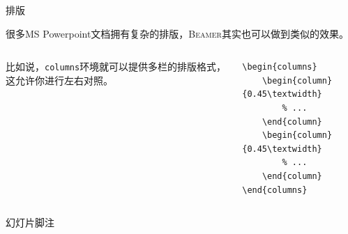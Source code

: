 \documentclass[aspectratio=169]{beamer}
\newcommand{\BibLaTeX}{\textsc{Bib}\LaTeX{}}
\newcommand{\Beamer}{\textsc{Beamer}}
\newcommand{\enableindent}{\setlength{\parskip}{6pt}\setlength{\parindent}{2em}}
\begin{document}
\begin{frame}[fragile]{排版}
	\enableindent

	很多MS Powerpoint文档拥有复杂的排版，\Beamer{}其实也可以做到类似的效果。
	\begin{columns}
		\begin{column}{0.45\textwidth}
			比如说，\texttt{columns}环境就可以提供多栏的排版格式，这允许你进行左右对照。
		\end{column}
		\begin{column}{0.45\textwidth}
\begin{verbatim}
\begin{columns}
    \begin{column}{0.45\textwidth}
        % ...
    \end{column}
    \begin{column}{0.45\textwidth}
        % ...
    \end{column}
\end{columns}
\end{verbatim}
		\end{column}
	\end{columns}
\end{frame}

\begin{frame}[fragile]{幻灯片脚注}

\end{frame}
\end{document}
